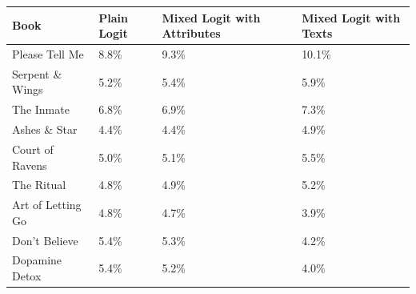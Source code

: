 \begin{centering}
\begin{tabular}{>{\raggedright}p{5cm}>{\raggedright}p{2cm}>{\centering}p{2cm}>{\centering}p{2cm}}
\hline
{\footnotesize\textbf{Book}} & {\footnotesize\textbf{Plain Logit}} & {\footnotesize\textbf{Mixed Logit with Attributes}} & {\footnotesize\textbf{Mixed Logit with Texts}}\tabularnewline
\hline
{\footnotesize Please Tell Me} & {\footnotesize 8.8\%} & {\footnotesize 9.3\%} & {\footnotesize 10.1\%}\tabularnewline
{\footnotesize Serpent \& Wings} & {\footnotesize 5.2\%} & {\footnotesize 5.4\%} & {\footnotesize 5.9\%}\tabularnewline
{\footnotesize The Inmate} & {\footnotesize 6.8\%} & {\footnotesize 6.9\%} & {\footnotesize 7.3\%}\tabularnewline
{\footnotesize Ashes \& Star} & {\footnotesize 4.4\%} & {\footnotesize 4.4\%} & {\footnotesize 4.9\%}\tabularnewline
{\footnotesize Court of Ravens} & {\footnotesize 5.0\%} & {\footnotesize 5.1\%} & {\footnotesize 5.5\%}\tabularnewline
{\footnotesize The Ritual} & {\footnotesize 4.8\%} & {\footnotesize 4.9\%} & {\footnotesize 5.2\%}\tabularnewline
{\footnotesize Art of Letting Go} & {\footnotesize 4.8\%} & {\footnotesize 4.7\%} & {\footnotesize 3.9\%}\tabularnewline
{\footnotesize Don't Believe} & {\footnotesize 5.4\%} & {\footnotesize 5.3\%} & {\footnotesize 4.2\%}\tabularnewline
{\footnotesize Dopamine Detox} & {\footnotesize 5.4\%} & {\footnotesize 5.2\%} & {\footnotesize 4.0\%}\tabularnewline
\hline
\end{tabular}
\par\end{centering}